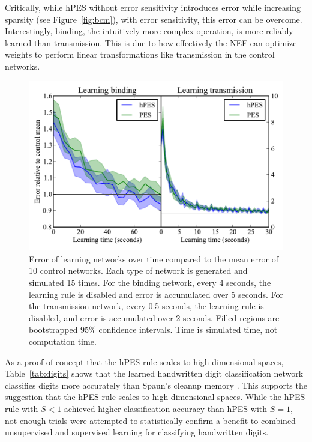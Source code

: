 \documentclass[10pt,letterpaper]{article}
\begin{document}
Critically, while hPES without error sensitivity
introduces error while increasing sparsity
(see Figure~\ref{fig:bcm}), with error sensitivity,
this error can be overcome.
Interestingly, binding,
the intuitively more complex operation,
is more reliably learned than transmission.
This is due to how effectively
the NEF can optimize weights to perform
linear transformations like transmission
in the control networks.

\begin{figure}[ht]
\begin{center}
\includegraphics[width=\columnwidth]{fig4-learn-curves}
\end{center}
\caption{Error of learning networks over time compared
  to the mean error of 10 control networks.
  Each type of network is generated and simulated 15 times.
  For the binding network, every 4 seconds,
  the learning rule is disabled and error is accumulated
  over 5 seconds.
  For the transmission network, every 0.5 seconds,
  the learning rule is disabled,
  and error is accumulated over 2 seconds.
  Filled regions are bootstrapped 95\% confidence intervals.
  Time is simulated time, not computation time.}
\label{fig:learn}
\end{figure}

As a proof of concept that the hPES rule
scales to high-dimensional spaces,
Table~\ref{tab:digits} shows that 
the learned handwritten digit classification network
classifies digits more accurately than Spaun's cleanup memory
\cite{Eliasmith2012}.
This supports the suggestion that the hPES rule
scales to high-dimensional spaces.
While the hPES rule with $S < 1$
achieved higher classification accuracy
than hPES with $S = 1$,
not enough trials were attempted to
statistically confirm a benefit to combined
unsupervised and supervised learning for classifying
handwritten digits.
\end{document}
